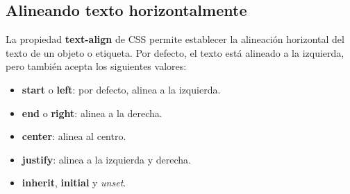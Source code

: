 \subsection{Alineando texto horizontalmente}

La propiedad \textbf{text-align} de CSS permite establecer la alineación horizontal del texto de un objeto o etiqueta. Por defecto, el texto está alineado a la izquierda, pero también acepta los siguientes valores:
\begin{itemize}
    \item \textbf{start} o \textbf{left}: por defecto, alinea a la izquierda.
    \item \textbf{end} o \textbf{right}: alinea a la derecha.
    \item \textbf{center}: alinea al centro.
    \item \textbf{justify}: alinea a la izquierda y derecha.
    \item \textbf{inherit}, \textbf{initial} y \textit{unset}.
\end{itemize}

